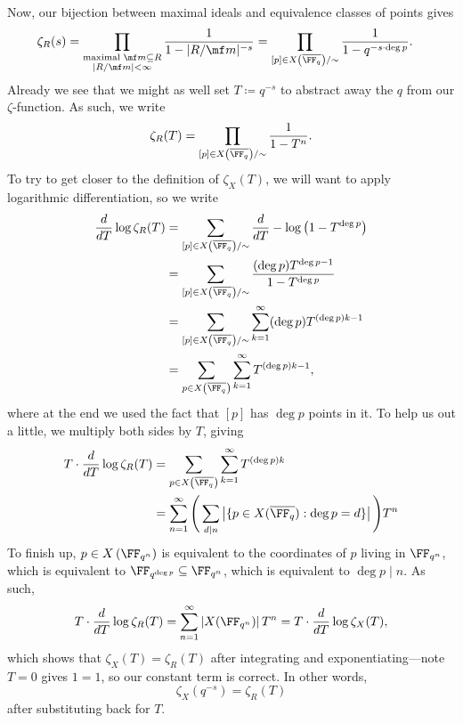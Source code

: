 \documentclass{article}
\begin{document}
Now, our bijection between maximal ideals and equivalence classes of points gives
\begin{align*}
	\zeta_R(s) &= \prod_{\substack{\text{maximal }\mf m\subseteq R\\|R/\mf m|<\infty}}\frac1{1-|R/\mf m|^{-s}} = \prod_{[p]\in X\left(\overline{\FF_q}\right)/\sim}\frac1{1-q^{-s\cdot \deg p}}.
\end{align*}
Already we see that we might as well set $T\coloneqq q^{-s}$ to abstract away the $q$ from our $\zeta$-function. As such, we write
\[\zeta_R(T)=\prod_{[p]\in X\left(\overline{\FF_q}\right)/\sim}\frac1{1-T^n}.\]
To try to get closer to the definition of $\zeta_X(T)$, we will want to apply logarithmic differentiation, so we write
\begin{align*}
	\frac d{dT}\log\zeta_R(T) &= \sum_{[p]\in X\left(\overline{\FF_q}\right)/\sim}\frac d{dT}-\log\left(1-T^{\deg p}\right) \\
	&= \sum_{[p]\in X\left(\overline{\FF_q}\right)/\sim}\frac{(\deg p)T^{\deg p-1}}{1-T^{\deg p}} \\
	&= \sum_{[p]\in X\left(\overline{\FF_q}\right)/\sim}\sum_{k=1}^\infty(\deg p)T^{(\deg p)k-1} \\
	&= \sum_{p\in X\left(\overline{\FF_q}\right)}\sum_{k=1}^\infty T^{(\deg p)k-1},
\end{align*}
where at the end we used the fact that $[p]$ has $\deg p$ points in it. To help us out a little, we multiply both sides by $T$, giving
\begin{align*}
	T\cdot\frac d{dT}\log\zeta_R(T) &= \sum_{p\in X\left(\overline{\FF_q}\right)}\sum_{k=1}^\infty T^{(\deg p)k} \\
	&= \sum_{n=1}^\infty\Bigg(\sum_{d\mid n}\left|\{p\in X(\overline{\FF_q}):\deg p=d\}\right|\Bigg)T^n
\end{align*}
To finish up, $p\in X\left(\FF_{q^n}\right)$ is equivalent to the coordinates of $p$ living in $\FF_{q^n}$, which is equivalent to $\FF_{q^{\deg p}}\subseteq\FF_{q^n}$, which is equivalent to $\deg p\mid n$. As such,
\[T\cdot\frac d{dT}\log\zeta_R(T)=\sum_{n=1}^\infty\left|X(\FF_{q^n})\right|T^n=T\cdot\frac d{dT}\log\zeta_X(T),\]
which shows that $\zeta_X(T)=\zeta_R(T)$ after integrating and exponentiating---note $T=0$ gives $1=1$, so our constant term is correct. In other words,
\begin{equation}
	\zeta_X\left(q^{-s}\right)=\zeta_R(T) \label{eq:wehaveazeta}
\end{equation}
after substituting back for $T$.
\end{document}

